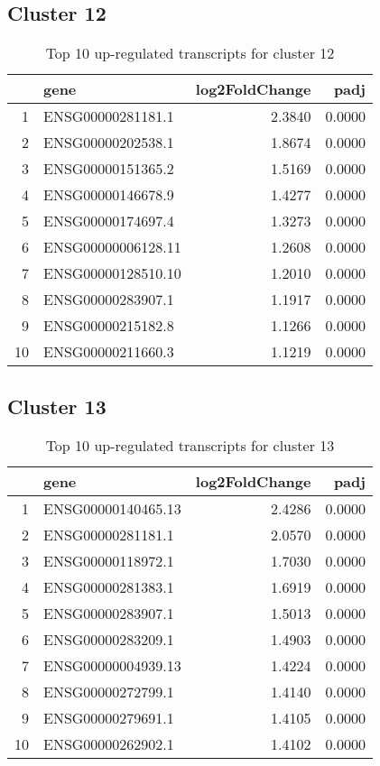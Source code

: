 \documentclass{article}
\begin{document}
\subsection{Cluster 12 }
\begin{table}[H]
\centering
\begin{tabularx}{\textwidth}{rlrr}
  \hline
 & gene & log2FoldChange & padj \\ 
  \hline
1 & ENSG00000281181.1 & 2.3840 & 0.0000 \\ 
  2 & ENSG00000202538.1 & 1.8674 & 0.0000 \\ 
  3 & ENSG00000151365.2 & 1.5169 & 0.0000 \\ 
  4 & ENSG00000146678.9 & 1.4277 & 0.0000 \\ 
  5 & ENSG00000174697.4 & 1.3273 & 0.0000 \\ 
  6 & ENSG00000006128.11 & 1.2608 & 0.0000 \\ 
  7 & ENSG00000128510.10 & 1.2010 & 0.0000 \\ 
  8 & ENSG00000283907.1 & 1.1917 & 0.0000 \\ 
  9 & ENSG00000215182.8 & 1.1266 & 0.0000 \\ 
  10 & ENSG00000211660.3 & 1.1219 & 0.0000 \\ 
   \hline
\end{tabularx}
\caption{Top 10 up-regulated transcripts for cluster 12} 
\label{tab:q3_1_12}
\end{table}
\subsection{Cluster 13 }
\begin{table}[H]
\centering
\begin{tabularx}{\textwidth}{rlrr}
  \hline
 & gene & log2FoldChange & padj \\ 
  \hline
1 & ENSG00000140465.13 & 2.4286 & 0.0000 \\ 
  2 & ENSG00000281181.1 & 2.0570 & 0.0000 \\ 
  3 & ENSG00000118972.1 & 1.7030 & 0.0000 \\ 
  4 & ENSG00000281383.1 & 1.6919 & 0.0000 \\ 
  5 & ENSG00000283907.1 & 1.5013 & 0.0000 \\ 
  6 & ENSG00000283209.1 & 1.4903 & 0.0000 \\ 
  7 & ENSG00000004939.13 & 1.4224 & 0.0000 \\ 
  8 & ENSG00000272799.1 & 1.4140 & 0.0000 \\ 
  9 & ENSG00000279691.1 & 1.4105 & 0.0000 \\ 
  10 & ENSG00000262902.1 & 1.4102 & 0.0000 \\ 
   \hline
\end{tabularx}
\caption{Top 10 up-regulated transcripts for cluster 13} 
\label{tab:q3_1_13}
\end{table}
\end{document}
